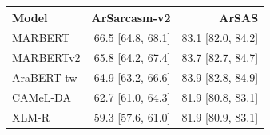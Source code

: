 \begin{tabular}{lrr}
\toprule
Model & ArSarcasm-v2 & ArSAS \\
\midrule
MARBERT & 66.5 {\scriptsize[64.8, 68.1]} & 83.1 {\scriptsize[82.0, 84.2]} \\
MARBERTv2 & 65.8 {\scriptsize[64.2, 67.4]} & 83.7 {\scriptsize[82.7, 84.7]} \\
AraBERT-tw & 64.9 {\scriptsize[63.2, 66.6]} & 83.9 {\scriptsize[82.8, 84.9]} \\
CAMeL-DA & 62.7 {\scriptsize[61.0, 64.3]} & 81.9 {\scriptsize[80.8, 83.1]} \\
XLM-R & 59.3 {\scriptsize[57.6, 61.0]} & 81.9 {\scriptsize[80.9, 83.1]} \\
\bottomrule
\end{tabular}
